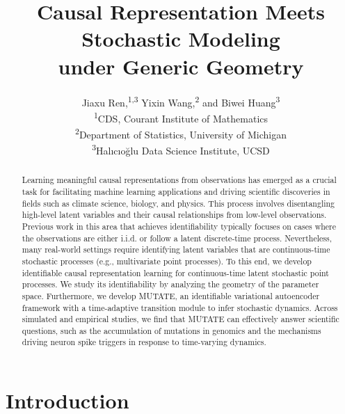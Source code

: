 \documentclass[10pt]{article}
\numberwithin{figure}{section}
\begin{document}
\title{Causal Representation Meets Stochastic Modeling \\under Generic Geometry} 

\author{
    Jiaxu Ren,\textsuperscript{1,3} \quad
    Yixin Wang,\textsuperscript{2} \quad and
    Biwei Huang\textsuperscript{3} \\[3mm]
    \textsuperscript{1}CDS, Courant Institute of Mathematics \\
    \textsuperscript{2}Department of Statistics, University of Michigan \\
    \textsuperscript{3}Halıcıoğlu Data Science Institute, UCSD
}


\maketitle
\begin{abstract}
\noindent 

Learning meaningful causal representations from observations has emerged as a crucial task for facilitating machine learning applications and driving scientific discoveries in fields such as climate science, biology, and physics. This process involves disentangling high-level latent variables and their causal relationships from low-level observations. Previous work in this area that achieves identifiability typically focuses on cases where the observations are either i.i.d. or follow a latent discrete-time process. Nevertheless, many real-world settings require identifying latent variables that are continuous-time stochastic processes (e.g., multivariate point processes). To this end, we develop identifiable causal representation learning for continuous-time latent stochastic point processes. We study its identifiability by analyzing the geometry of the parameter space. Furthermore,  we develop MUTATE, an identifiable variational autoencoder framework with a time-adaptive transition module to infer stochastic dynamics. Across simulated and empirical studies, we find that MUTATE can effectively answer scientific questions,  such as the accumulation of mutations in genomics and the mechanisms driving neuron spike triggers in response to time-varying dynamics.

\end{abstract}
\section{Introduction}
\end{document}
